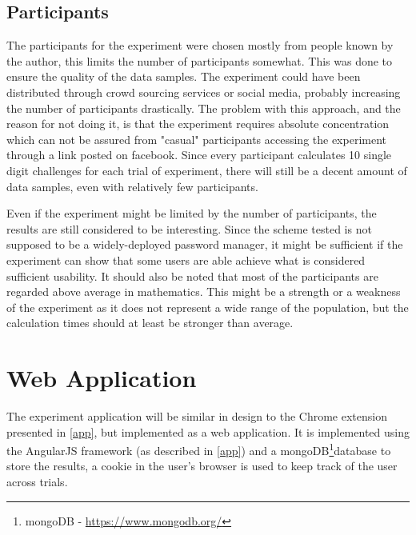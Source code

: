 \subsection{Participants}
The participants for the experiment were chosen mostly from people known by the author, this limits the number of participants somewhat. This was done to ensure the quality of the data samples. The experiment could have been distributed through crowd sourcing services or social media, probably increasing the number of participants drastically. The problem with this approach, and the reason for not doing it, is that the experiment requires absolute concentration which can not be assured from "casual" participants accessing the experiment through a link posted on facebook. Since every participant calculates 10 single digit challenges for each trial of experiment, there will still be a decent amount of data samples, even with relatively few participants. 
\par Even if the experiment might be limited by the number of participants, the results are still considered to be interesting. Since the scheme tested is not supposed to be a widely-deployed password manager, it might be sufficient if the experiment can show that some users are able achieve what is considered sufficient usability. It should also be noted that most of the participants are regarded above average in mathematics. This might be a strength or a weakness of the experiment as it does not represent a wide range of the population, but the calculation times should at least be stronger than average.


\section{Web Application}
The experiment application will be similar in design to the Chrome extension presented in \autoref{app}, but implemented as a web application. It is implemented using the AngularJS framework (as described in \autoref{app}) and a mongoDB\footnote{mongoDB - \url{https://www.mongodb.org/}}database to store the results, a cookie in the user's browser is used to keep track of the user across trials. 

